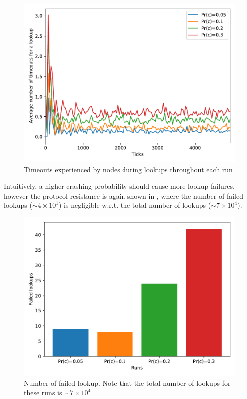 \documentclass[11pt,twocolumn,letterpaper]{article}
\begin{document}
		\begin{figure}[!ht]
			\centering
			\includegraphics[width=\linewidth,clip,trim=0 0.5cm 0 0.35cm]{figures/analysis1/timeouts_time.pdf}
			\caption{Timeouts experienced by nodes during lookups throughout each run}
			\label{fig:crash5}
		\end{figure}

		Intuitively, a higher crashing probability should cause more lookup failures, however the protocol resistance is again shown in , where the number of failed lookups ($\sim4\times10^1$) is negligible w.r.t. the total number of lookups ($\sim7\times10^4$). 

		\begin{figure}[!ht]
			\centering
			\includegraphics[width=\linewidth,clip,trim=0 0.5cm 0 0.35cm]{figures/analysis1/failedlookups.pdf}
			\caption{Number of failed lookup. Note that the total number of lookups for these runs is $\sim7\times10^4$}
			\label{fig:crash6}
		\end{figure}
	
\end{document}
